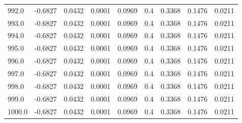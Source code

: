 \begin{longtable}{lrrrrrrrr}
992.0 & -0.6827 & 0.0432 & 0.0001 & 0.0969 & 0.4 & 0.3368 & 0.1476 & 0.0211 \\
993.0 & -0.6827 & 0.0432 & 0.0001 & 0.0969 & 0.4 & 0.3368 & 0.1476 & 0.0211 \\
994.0 & -0.6827 & 0.0432 & 0.0001 & 0.0969 & 0.4 & 0.3368 & 0.1476 & 0.0211 \\
995.0 & -0.6827 & 0.0432 & 0.0001 & 0.0969 & 0.4 & 0.3368 & 0.1476 & 0.0211 \\
996.0 & -0.6827 & 0.0432 & 0.0001 & 0.0969 & 0.4 & 0.3368 & 0.1476 & 0.0211 \\
997.0 & -0.6827 & 0.0432 & 0.0001 & 0.0969 & 0.4 & 0.3368 & 0.1476 & 0.0211 \\
998.0 & -0.6827 & 0.0432 & 0.0001 & 0.0969 & 0.4 & 0.3368 & 0.1476 & 0.0211 \\
999.0 & -0.6827 & 0.0432 & 0.0001 & 0.0969 & 0.4 & 0.3368 & 0.1476 & 0.0211 \\
1000.0 & -0.6827 & 0.0432 & 0.0001 & 0.0969 & 0.4 & 0.3368 & 0.1476 & 0.0211 \\
\end{longtable}
